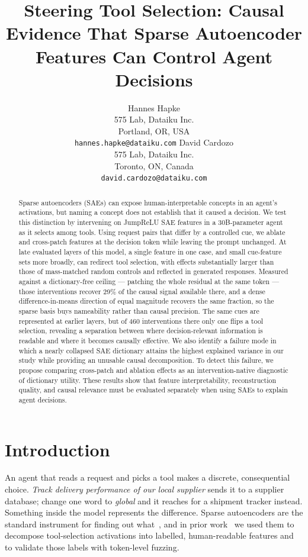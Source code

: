 \documentclass{article}
\title{Steering Tool Selection: Causal Evidence That Sparse Autoencoder Features Can Control Agent Decisions}
\author{%
  Hannes Hapke \\
  575 Lab, Dataiku Inc.\\
  Portland, OR, USA\\
  \texttt{hannes.hapke@dataiku.com}
  \And
  David Cardozo \\
  575 Lab, Dataiku Inc.\\
  Toronto, ON, Canada\\
  \texttt{david.cardozo@dataiku.com}
}
\begin{document}
\maketitle
\begin{abstract}
Sparse autoencoders (SAEs) can expose human-interpretable concepts in an
agent's activations, but naming a concept does not establish that it caused a
decision. We test this distinction by intervening on JumpReLU SAE features in
a 30B-parameter agent as it selects among tools. Using request pairs that
differ by a controlled cue, we ablate and cross-patch features at the decision
token while leaving the prompt unchanged. At late evaluated layers of this
model, a single feature in one case, and small cue-feature sets more broadly,
can redirect tool selection,
with effects substantially larger than those of mass-matched random controls
and reflected in generated responses. Measured against a dictionary-free
ceiling --- patching the whole residual at the same token --- those
interventions recover 29\% of the causal signal available there, and a dense
difference-in-means direction of equal magnitude recovers the same fraction, so
the sparse basis buys nameability rather than causal precision. The same cues are represented at
earlier layers, but of 460 interventions there only one flips a tool
selection, revealing a separation between where decision-relevant information is
readable and where it becomes causally effective. We also identify a failure
mode in which a nearly collapsed SAE dictionary attains the highest explained
variance in our study while providing an unusable causal decomposition. To
detect this failure, we propose comparing cross-patch and ablation effects as
an intervention-native diagnostic of dictionary utility. These results show
that feature interpretability, reconstruction quality, and causal relevance
must be evaluated separately when using SAEs to explain agent decisions.
\end{abstract}
%
\section{Introduction}
\label{sec:intro}

An agent that reads a request and picks a tool makes a discrete, consequential choice. \emph{Track delivery performance of our local supplier} sends it to a supplier database; change one word to \emph{global} and it reaches for a shipment tracker instead. Something inside the model represents the difference. Sparse autoencoders are the standard instrument for finding out what~\cite{ref_bricken2023,cunningham2023sparseautoencodershighlyinterpretable}, and in prior work~\cite{ref_hapke2025} we used them to decompose tool-selection activations into labelled, human-readable features and to validate those labels with token-level fuzzing.
\end{document}
